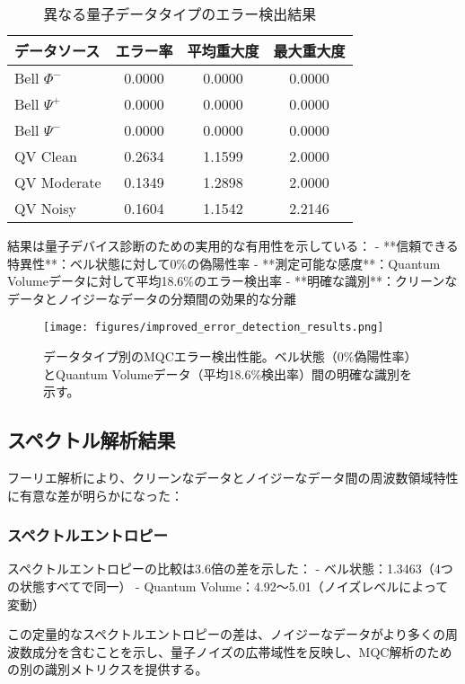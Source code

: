 \documentclass[a4paper,11pt]{article}
\begin{document}
\begin{CJK}{UTF8}{min}
\begin{table}[h]
\centering
\caption{異なる量子データタイプのエラー検出結果}
\begin{tabular}{lccc}
\hline
データソース & エラー率 & 平均重大度 & 最大重大度 \\
\hline
Bell $\Phi^-$ & 0.0000 & 0.0000 & 0.0000 \\
Bell $\Psi^+$ & 0.0000 & 0.0000 & 0.0000 \\
Bell $\Psi^-$ & 0.0000 & 0.0000 & 0.0000 \\
QV Clean & 0.2634 & 1.1599 & 2.0000 \\
QV Moderate & 0.1349 & 1.2898 & 2.0000 \\
QV Noisy & 0.1604 & 1.1542 & 2.2146 \\
\hline
\end{tabular}
\end{table}

結果は量子デバイス診断のための実用的な有用性を示している：
- **信頼できる特異性**：ベル状態に対して0\%の偽陽性率
- **測定可能な感度**：Quantum Volumeデータに対して平均18.6\%のエラー検出率
- **明確な識別**：クリーンなデータとノイジーなデータの分類間の効果的な分離

\begin{figure}[H]
\centering
\texttt{[image: figures/improved\_error\_detection\_results.png]}
\caption{データタイプ別のMQCエラー検出性能。ベル状態（0\%偽陽性率）とQuantum Volumeデータ（平均18.6\%検出率）間の明確な識別を示す。}
\label{fig:error_detection}
\end{figure}

\subsection{スペクトル解析結果}

フーリエ解析により、クリーンなデータとノイジーなデータ間の周波数領域特性に有意な差が明らかになった：

\subsubsection{スペクトルエントロピー}
スペクトルエントロピーの比較は3.6倍の差を示した：
- ベル状態：1.3463（4つの状態すべてで同一）
- Quantum Volume：4.92〜5.01（ノイズレベルによって変動）

この定量的なスペクトルエントロピーの差は、ノイジーなデータがより多くの周波数成分を含むことを示し、量子ノイズの広帯域性を反映し、MQC解析のための別の識別メトリクスを提供する。


\end{CJK}
\end{document}
